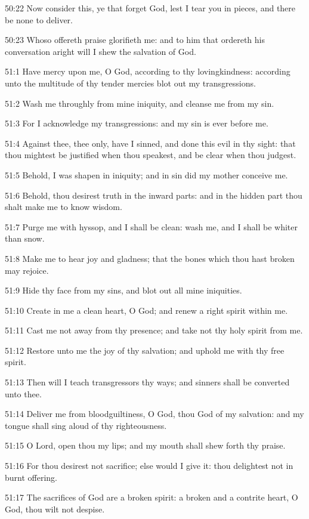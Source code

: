 50:22 Now consider this, ye that forget God, lest I tear you in pieces, and there be none to deliver.

50:23 Whoso offereth praise glorifieth me: and to him that ordereth his conversation aright will I shew the salvation of God.



51:1 Have mercy upon me, O God, according to thy lovingkindness: according unto the multitude of thy tender mercies blot out my transgressions.

51:2 Wash me throughly from mine iniquity, and cleanse me from my sin.

51:3 For I acknowledge my transgressions: and my sin is ever before me.

51:4 Against thee, thee only, have I sinned, and done this evil in thy sight: that thou mightest be justified when thou speakest, and be clear when thou judgest.

51:5 Behold, I was shapen in iniquity; and in sin did my mother conceive me.

51:6 Behold, thou desirest truth in the inward parts: and in the hidden part thou shalt make me to know wisdom.

51:7 Purge me with hyssop, and I shall be clean: wash me, and I shall be whiter than snow.

51:8 Make me to hear joy and gladness; that the bones which thou hast broken may rejoice.

51:9 Hide thy face from my sins, and blot out all mine iniquities.

51:10 Create in me a clean heart, O God; and renew a right spirit within me.

51:11 Cast me not away from thy presence; and take not thy holy spirit from me.

51:12 Restore unto me the joy of thy salvation; and uphold me with thy free spirit.

51:13 Then will I teach transgressors thy ways; and sinners shall be converted unto thee.

51:14 Deliver me from bloodguiltiness, O God, thou God of my salvation: and my tongue shall sing aloud of thy righteousness.

51:15 O Lord, open thou my lips; and my mouth shall shew forth thy praise.

51:16 For thou desirest not sacrifice; else would I give it: thou delightest not in burnt offering.

51:17 The sacrifices of God are a broken spirit: a broken and a contrite heart, O God, thou wilt not despise.

